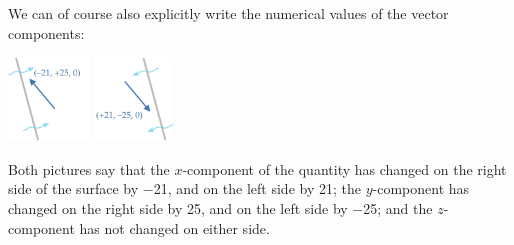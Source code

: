 \documentclass[a4paper,12pt,%
onecolumn,oneside,%
british%
]{memoir}
\providecommand{\href}[2]{#2}
\renewcommand*{\|}[1][]{\nonscript\:#1\vert\nonscript\:\mathopen{}}
\newcommand*{\furl}[2]{\href{#1}{#2}\pagenote{\url{#1}}}
\begin{document}

\smallskip

We can of course also explicitly write the numerical values of the vector components:\noprelistbreak
\begin{center}\label{fig:vector_fluxes_components}
  \bigskip
  \hspace*{\fill}
  \includegraphics[align=c,height=6em]{images/flux_vec_right_num.pdf}
\qquad
\includegraphics[align=c,height=6em]{images/flux_vec_left_num.pdf}
\hspace*{\fill}
\end{center}
Both pictures say that the $x$-component of the quantity has changed on the right side of the surface by \num{-21}, and on the left side by \num{+21}; the $y$-component  has changed on the right side by \num{+25}, and on the left side by \num{-25}; and the $z$-component has not changed on either side.

\medskip
\end{document}
